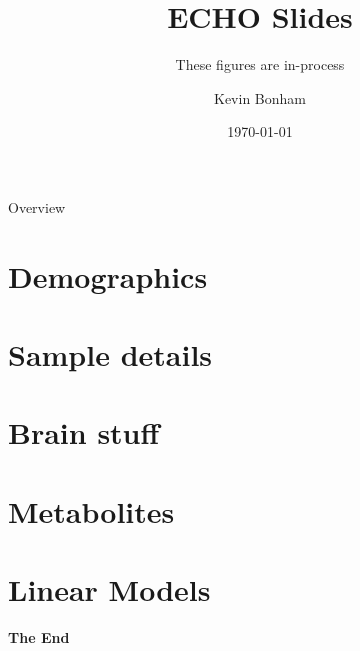 \documentclass[aspectratio=169,xcolor=dvipsnames]{beamer}
\title[short title]{ECHO Slides} %
\subtitle{These figures are in-process}
\author[Bonham] {Kevin Bonham}
\institute[Wellesley College] %
{
    Department of Biological Sciences \\
    Wellesley College
}
\date{\today} %
\begin{document}
\begin{frame}
    \titlepage
\end{frame}

\begin{frame}{Overview}
    \tableofcontents
\end{frame}


\section{Demographics}



\section{Sample details}



\section{Brain stuff}



\section{Metabolites}



\section{Linear Models}



\begin{frame}
    \Huge{\centerline{\textbf{The End}}}
\end{frame}

\end{document}
